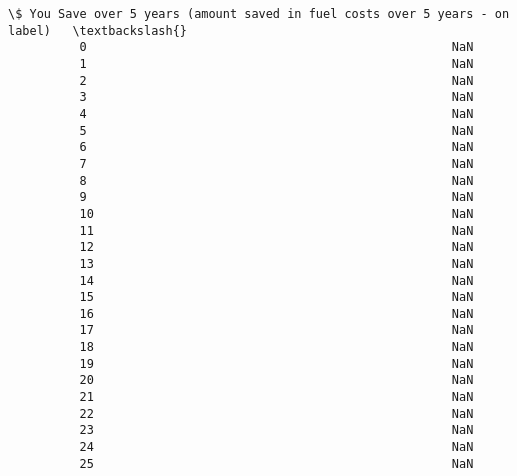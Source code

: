 \documentclass[11pt]{article}
\begin{document}
\begin{Verbatim}[commandchars=\\\{\}]
                \$ You Save over 5 years (amount saved in fuel costs over 5 years - on label)   \textbackslash{}
          0                                                   NaN                               
          1                                                   NaN                               
          2                                                   NaN                               
          3                                                   NaN                               
          4                                                   NaN                               
          5                                                   NaN                               
          6                                                   NaN                               
          7                                                   NaN                               
          8                                                   NaN                               
          9                                                   NaN                               
          10                                                  NaN                               
          11                                                  NaN                               
          12                                                  NaN                               
          13                                                  NaN                               
          14                                                  NaN                               
          15                                                  NaN                               
          16                                                  NaN                               
          17                                                  NaN                               
          18                                                  NaN                               
          19                                                  NaN                               
          20                                                  NaN                               
          21                                                  NaN                               
          22                                                  NaN                               
          23                                                  NaN                               
          24                                                  NaN                               
          25                                                  NaN                               

\end{Verbatim}
\end{document}

